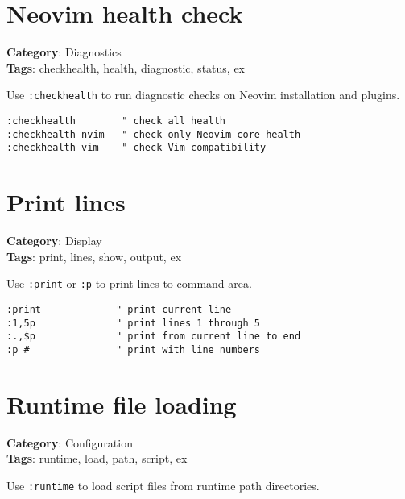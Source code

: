 {{{{{\section{Neovim health check}

\textbf{Category}: Diagnostics\\ \textbf{Tags}: checkhealth, health, diagnostic, status, ex
\vspace{0.5cm}

Use {\footnotesize \Verb§:checkhealth§} to run diagnostic checks on Neovim installation and plugins.

\begin{Exa*}{}
\begin{Verbatim}[fontsize=\footnotesize, breaklines, breakanywhere]
:checkhealth        " check all health
:checkhealth nvim   " check only Neovim core health
:checkhealth vim    " check Vim compatibility
\end{Verbatim}
\end{Exa*}

\section{Print lines}

\textbf{Category}: Display\\ \textbf{Tags}: print, lines, show, output, ex
\vspace{0.5cm}

Use {\footnotesize \Verb§:print§} or {\footnotesize \Verb§:p§} to print lines to command area.

\begin{Exa*}{}
\begin{Verbatim}[fontsize=\footnotesize, breaklines, breakanywhere]
:print             " print current line
:1,5p              " print lines 1 through 5
:.,$p              " print from current line to end
:p #               " print with line numbers
\end{Verbatim}
\end{Exa*}

\section{Runtime file loading}

\textbf{Category}: Configuration\\ \textbf{Tags}: runtime, load, path, script, ex
\vspace{0.5cm}

Use {\footnotesize \Verb§:runtime§} to load script files from runtime path directories.

}}}}}
